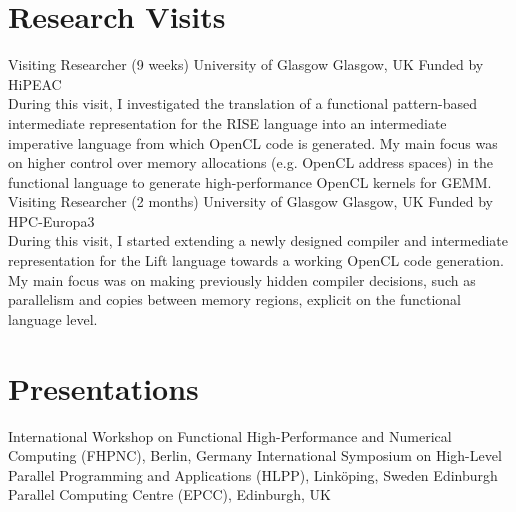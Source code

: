 \documentclass[11pt,a4paper]{moderncv}        %
\begin{document}
\newpage
\section{Research Visits}
			{Visiting Researcher (9 weeks)}
		    {University of Glasgow}
		    {Glasgow, UK}{}
			{Funded by HiPEAC\\
            During this visit, I investigated the translation of a functional pattern-based intermediate representation for the RISE language into an intermediate imperative language from which OpenCL code is generated.
            My main focus was on higher control over memory allocations (e.g. OpenCL address spaces) in the functional language to generate high-performance OpenCL kernels for GEMM.}
			{Visiting Researcher (2 months)}
		    {University of Glasgow}
		    {Glasgow, UK}{}
			{Funded by HPC-Europa3\\
             During this visit, I started extending a newly designed compiler and intermediate representation for the Lift language towards a working OpenCL code generation.
             My main focus was on making previously hidden compiler decisions, such as parallelism and copies between memory regions, explicit on the functional language level.}


\section{Presentations}
            {}{}{}{}
            {International Workshop on Functional High-Performance and Numerical Computing (FHPNC), Berlin, Germany}
            {}{}{}{}
            {International Symposium on High-Level Parallel Programming and Applications (HLPP), Linköping, Sweden}
            {}{}{}{}
            {Edinburgh Parallel Computing Centre (EPCC), Edinburgh, UK}
\end{document}
